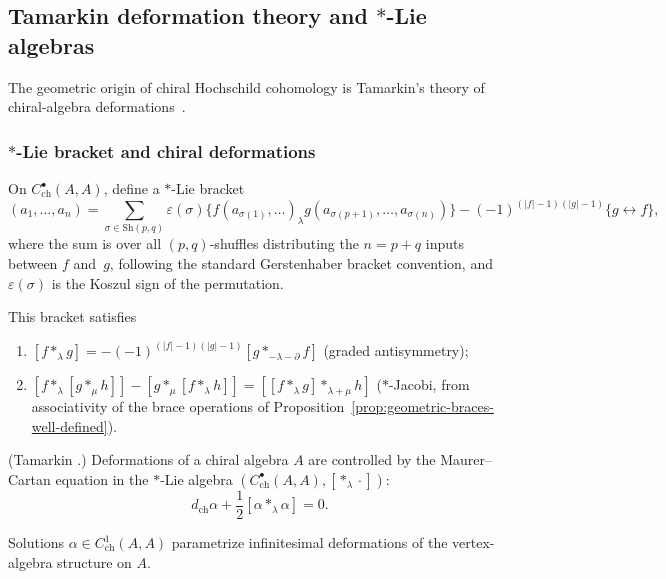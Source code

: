 \subsection{\texorpdfstring{Tamarkin deformation theory and $*$-Lie algebras}{Tamarkin deformation theory and star-Lie algebras}}

The geometric origin of chiral Hochschild cohomology is Tamarkin's theory of chiral-algebra deformations~\cite{Tam02}.

\subsubsection{\texorpdfstring{$*$-Lie bracket and chiral deformations}{Star-Lie bracket and chiral deformations}}
\begin{definition}
\label{def:star_lie}
On $C^\bullet_{\text{ch}}(A, A)$, define a $*$-Lie bracket
\begin{equation}
[f *_\lambda g](a_1, \ldots, a_n) = \sum_{\sigma \in \mathrm{Sh}(p,q)} \varepsilon(\sigma) \{f(a_{\sigma(1)}, \ldots)_\lambda g(a_{\sigma(p+1)}, \ldots, a_{\sigma(n)})\} - (-1)^{(|f|-1)(|g|-1)} \{g \leftrightarrow f\},
\end{equation}
where the sum is over all $(p,q)$-shuffles distributing the $n = p+q$ inputs between $f$ and~$g$, following the standard Gerstenhaber bracket convention, and $\varepsilon(\sigma)$ is the Koszul sign of the permutation.
\end{definition}

This bracket satisfies
\begin{enumerate}[label=(\roman*)]
\item $[f *_\lambda g] = -(-1)^{(|f|-1)(|g|-1)} [g *_{-\lambda-\partial} f]$ (graded antisymmetry);
\item $[f *_\lambda [g *_\mu h]] - [g *_\mu [f *_\lambda h]] = [[f *_\lambda g] *_{\lambda + \mu} h]$ ($*$-Jacobi, from associativity of the brace operations of Proposition~\ref{prop:geometric-braces-well-defined}).
\end{enumerate}

\begin{theorem}
\label{thm:Tamarkin_deformation}
(Tamarkin \cite{Tam02}.) Deformations of a chiral algebra $A$ are controlled by the Maurer--Cartan equation in the $*$-Lie algebra $(C^\bullet_{\text{ch}}(A, A), [*_\lambda \cdot])$:
\begin{equation}
d_{\text{ch}} \alpha + \frac{1}{2} [\alpha *_\lambda \alpha] = 0.
\end{equation}

Solutions $\alpha \in C^1_{\text{ch}}(A, A)$ parametrize infinitesimal deformations of the vertex-algebra structure on $A$.
\end{theorem}

